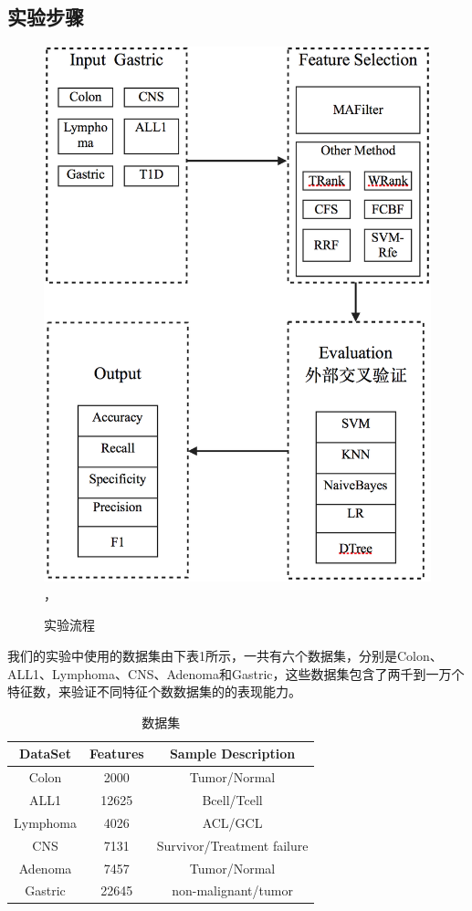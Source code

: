 \documentclass{njubachelor}
\begin{document}
\subsection{实验步骤}
\begin{figure}[!ht]
    \centering
    \includegraphics[width=4.5in]{pic/fig4}， 
    \caption{实验流程}
\end{figure}

我们的实验中使用的数据集由下表1所示，一共有六个数据集，分别是Colon、ALL1、Lymphoma、CNS、Adenoma和Gastric，这些数据集包含了两千到一万个特征数，来验证不同特征个数数据集的的表现能力。

\begin{table}        
\centering
\caption{数据集}
\begin{tabular}{ccc}
\hline
DataSet & Features & Sample Description\\
\hline
Colon & 2000 & Tumor/Normal\\
ALL1 & 12625 & Bcell/Tcell\\
Lymphoma & 4026 & ACL/GCL\\
CNS & 7131 & Survivor/Treatment failure\\
Adenoma & 7457 & Tumor/Normal\\
Gastric & 22645 & non-malignant/tumor\\
\hline
\end{tabular}
\end{table}
\end{document}
